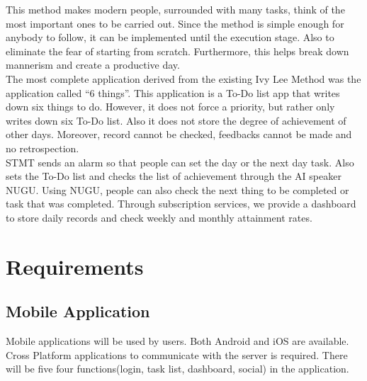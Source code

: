 \documentclass[conference]{IEEEtran}
\begin{document}
This method makes modern people, surrounded with many tasks, think of the most important ones to be carried out. Since the method is simple enough for anybody to follow, it can be implemented until the execution stage. Also to eliminate the fear of starting from scratch. Furthermore, this helps break down mannerism and create a productive day. \\
 
The most complete application derived from the existing Ivy Lee Method was the application called “6 things”. This application is a To-Do list app that writes down six things to do. However, it does not force a priority, but rather only writes down six To-Do list. Also it does not store the degree of achievement of other days. Moreover, record cannot be checked, feedbacks cannot be made and no retrospection. \\

STMT sends an alarm so that people can set the day or the next day task. Also sets the To-Do list and checks the list of achievement through the AI speaker NUGU. Using NUGU, people can also check the next thing to be completed or task that was completed. Through subscription services, we provide a dashboard to store daily records and check weekly and monthly attainment rates.\\

\section{Requirements}

\subsection{Mobile Application}

Mobile applications will be used by users. Both Android and iOS are available. Cross Platform applications to communicate with the server is required. There will be five four functions(login, task list, dashboard, social) in the application.\\
\end{document}
